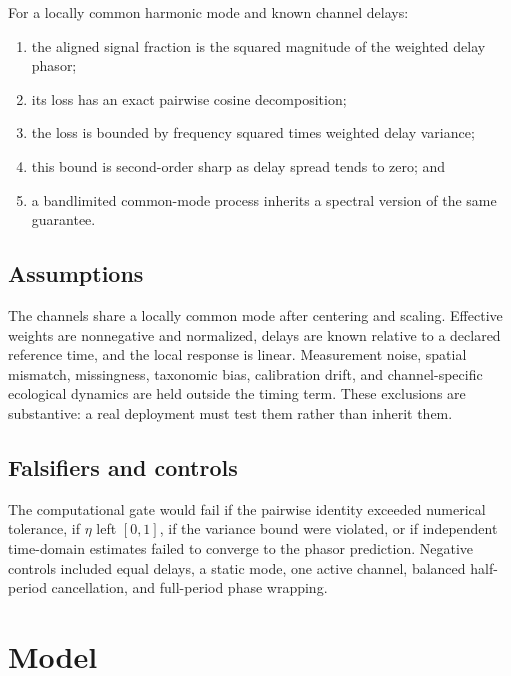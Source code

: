 \documentclass[10pt]{article}
\begin{document}
For a locally common harmonic mode and known channel delays:

\begin{enumerate}
\item the aligned signal fraction is the squared magnitude of the weighted
delay phasor;
\item its loss has an exact pairwise cosine decomposition;
\item the loss is bounded by frequency squared times weighted delay variance;
\item this bound is second-order sharp as delay spread tends to zero; and
\item a bandlimited common-mode process inherits a spectral version of the
same guarantee.
\end{enumerate}

\subsection{Assumptions}

The channels share a locally common mode after centering and scaling.  Effective
weights are nonnegative and normalized, delays are known relative to a declared
reference time, and the local response is linear.  Measurement noise, spatial
mismatch, missingness, taxonomic bias, calibration drift, and channel-specific
ecological dynamics are held outside the timing term.  These exclusions are
substantive: a real deployment must test them rather than inherit them.

\subsection{Falsifiers and controls}

The computational gate would fail if the pairwise identity exceeded numerical
tolerance, if $\eta$ left $[0,1]$, if the variance bound were violated, or if
independent time-domain estimates failed to converge to the phasor prediction.
Negative controls included equal delays, a static mode, one active channel,
balanced half-period cancellation, and full-period phase wrapping.

\section{Model}
\end{document}
